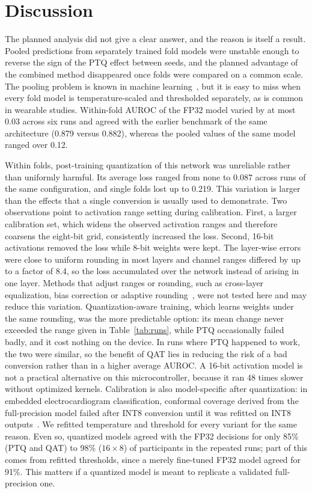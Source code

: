 \documentclass[preprint,12pt]{elsarticle}
\begin{document}
\section{Discussion}
\label{sec:discussion}
The planned analysis did not give a clear answer, and the reason is itself a result. Pooled predictions from separately trained fold models were unstable enough to reverse the sign of the PTQ effect between seeds, and the planned advantage of the combined method disappeared once folds were compared on a common scale. The pooling problem is known in machine learning~\cite{Forman2010,Airola2011}, but it is easy to miss when every fold model is temperature-scaled and thresholded separately, as is common in wearable studies. Within-fold AUROC of the FP32 model varied by at most 0.03 across six runs and agreed with the earlier benchmark of the same architecture (0.879 versus 0.882), whereas the pooled values of the same model ranged over 0.12.

Within folds, post-training quantization of this network was unreliable rather than uniformly harmful. Its average loss ranged from none to 0.087 across runs of the same configuration, and single folds lost up to 0.219. This variation is larger than the effects that a single conversion is usually used to demonstrate. Two observations point to activation range setting during calibration. First, a larger calibration set, which widens the observed activation ranges and therefore coarsens the eight-bit grid, consistently increased the loss. Second, 16-bit activations removed the loss while 8-bit weights were kept. The layer-wise errors were close to uniform rounding in most layers and channel ranges differed by up to a factor of 8.4, so the loss accumulated over the network instead of arising in one layer. Methods that adjust ranges or rounding, such as cross-layer equalization, bias correction or adaptive rounding~\cite{NagelDFQ2019,Nagel2021}, were not tested here and may reduce this variation. Quantization-aware training, which learns weights under the same rounding, was the more predictable option: its mean change never exceeded the range given in Table~\ref{tab:runs}, while PTQ occasionally failed badly, and it cost nothing on the device. In runs where PTQ happened to work, the two were similar, so the benefit of QAT lies in reducing the risk of a bad conversion rather than in a higher average AUROC. A 16-bit activation model is not a practical alternative on this microcontroller, because it ran 48 times slower without optimized kernels. Calibration is also model-specific after quantization: in embedded electrocardiogram classification, conformal coverage derived from the full-precision model failed after INT8 conversion until it was refitted on INT8 outputs~\cite{ElAllam2026}. We refitted temperature and threshold for every variant for the same reason. Even so, quantized models agreed with the FP32 decisions for only 85\% (PTQ and QAT) to 98\% ($16\times8$) of participants in the repeated runs; part of this comes from refitted thresholds, since a merely fine-tuned FP32 model agreed for 91\%. This matters if a quantized model is meant to replicate a validated full-precision one.
\end{document}
